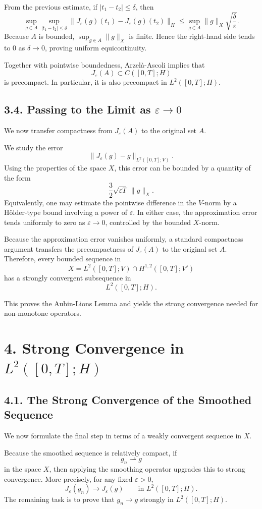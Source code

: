 \documentclass[11pt]{article}
\theoremstyle{definition}
\theoremstyle{remark}
\begin{document}
From the previous estimate, if \(|t_1-t_2|\le \delta\), then
\[
\sup_{g\in A}\sup_{|t_1-t_2|\le \delta}
\|J_\varepsilon(g)(t_1)-J_\varepsilon(g)(t_2)\|_H
\le
\sup_{g\in A}\|g\|_X
\sqrt{\frac{\delta}{\varepsilon}}.
\]
Because \(A\) is bounded, \(\sup_{g\in A}\|g\|_X\) is finite. Hence the right-hand side tends to \(0\) as \(\delta\to 0\), proving uniform equicontinuity.

Together with pointwise boundedness, Arzelà-Ascoli implies that
\[
J_\varepsilon(A)\subset C([0,T];H)
\]
is precompact. In particular, it is also precompact in \(L^2([0,T];H)\).

\subsection*{3.4. Passing to the Limit as \(\varepsilon\to 0\)}
We now transfer compactness from \(J_\varepsilon(A)\) to the original set \(A\).

We study the error
\[
\|J_\varepsilon(g)-g\|_{L^2([0,T];V)}.
\]
Using the properties of the space \(X\), this error can be bounded by a quantity of the form
\[
\frac{3}{2}\sqrt{\varepsilon T}\,\|g\|_X.
\]
Equivalently, one may estimate the pointwise difference in the \(V\)-norm by a Hölder-type bound involving a power of \(\varepsilon\). In either case, the approximation error tends uniformly to zero as \(\varepsilon\to 0\), controlled by the bounded \(X\)-norm.

Because the approximation error vanishes uniformly, a standard compactness argument transfers the precompactness of \(J_\varepsilon(A)\) to the original set \(A\). Therefore, every bounded sequence in
\[
X=L^2([0,T];V)\cap H^{1,2}([0,T];V')
\]
has a strongly convergent subsequence in
\[
L^2([0,T];H).
\]

This proves the Aubin-Lions Lemma and yields the strong convergence needed for non-monotone operators.

\section*{4. Strong Convergence in \(L^2([0,T];H)\)}

\subsection*{4.1. The Strong Convergence of the Smoothed Sequence}
We now formulate the final step in terms of a weakly convergent sequence in \(X\).

Because the smoothed sequence is relatively compact, if
\[
g_n\rightharpoonup g
\]
in the space \(X\), then applying the smoothing operator upgrades this to strong convergence. More precisely, for any fixed \(\varepsilon>0\),
\[
J_\varepsilon(g_n)\to J_\varepsilon(g)
\qquad
\text{in } L^2([0,T];H).
\]
The remaining task is to prove that \(g_n\to g\) strongly in \(L^2([0,T];H)\).
\end{document}
